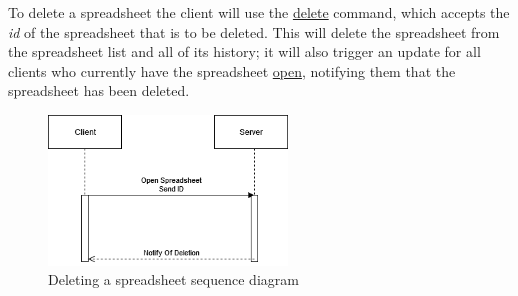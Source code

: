To delete a spreadsheet the client will use the \hyperref[sec:message:delete]{delete} 
command, which accepts the \emph{id} of the spreadsheet that is to be deleted. This will 
delete the spreadsheet from the spreadsheet list and all of its history; it will also trigger 
an update for all clients who currently have the spreadsheet \hyperref[sec:message:open]{open}, 
notifying them that the spreadsheet has been deleted.

\begin{figure}[H]
    \begin{center}
        \includegraphics[width=2.5in]{Figures/delete_sprd.png}
        \caption{Deleting a spreadsheet sequence diagram}
    \end{center}
\end{figure}

